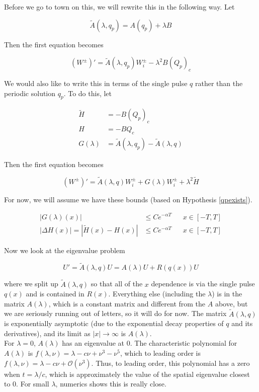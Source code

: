 \documentclass[12pt]{article}
\begin{document}
Before we go to town on this, we will rewrite this in the following way. Let

\[
\tilde{A}(\lambda, q_p) = A(q_p) + \lambda B
\]

Then the first equation becomes 

\[
(W^\pm)' = \tilde{A}(\lambda, q_p) W_i^\pm - \lambda^2 B (Q_p)_c
\]

We would also like to write this in terms of the single pulse $q$ rather than the periodic solution $q_p$. To do this, let

\begin{align*}
\tilde{H} &= -B(Q_p)_c \\
H &= -B Q_c \\
G(\lambda) &= \tilde{A}(\lambda, q_p) - \tilde{A}(\lambda, q)
\end{align*}

Then the first equation becomes 

\[
(W^\pm)' = \tilde{A}(\lambda, q) W_i^\pm + G(\lambda) W_i^\pm + \lambda^2 \tilde{H}
\]

For now, we will assume we have these bounds (based on Hypothesis \ref{qpexists}).

\begin{align*}
|G(\lambda)(x)| &\leq C e^{-\alpha T} && x \in [-T, T]\\
|\Delta H(x)| = |\tilde{H}(x) - H(x)| &\leq C e^{-\alpha T} && x \in [-T, T]
\end{align*}

Now we look at the eigenvalue problem

\begin{equation}
U' = \tilde{A}(\lambda, q) U = A(\lambda) U + R(q(x)) U
\end{equation}

where we split up $\tilde{A}(\lambda, q)$ so that all of the $x$ dependence is via the single pulse $q(x)$ and is contained in $R(x)$. Everything else (including the $\lambda$) is in the matrix $A(\lambda)$, which is a constant matrix and different from the $A$ above, but we are seriously running out of letters, so it will do for now. The matrix $\tilde{A}(\lambda, q)$ is exponentially asymptotic (due to the exponential decay properties of $q$ and its derivatives), and its limit as $|x| \rightarrow \infty$ is $A(\lambda)$.\\

For $\lambda = 0$, $A(\lambda)$ has an eigenvalue at 0. The characteristic polynomial for $A(\lambda)$ is $f(\lambda, \nu) = \lambda - c \nu + \nu^3 - \nu^5$, which to leading order is $f(\lambda, \nu) = \lambda - c \nu + \mathcal{O}(\nu^3)$. Thus, to leading order, this polynomial has a zero when $t = \lambda / c$, which is approximately the value of the spatial eigenvalue closest to 0. For small $\lambda$, numerics shows this is really close.\\
\end{document}
